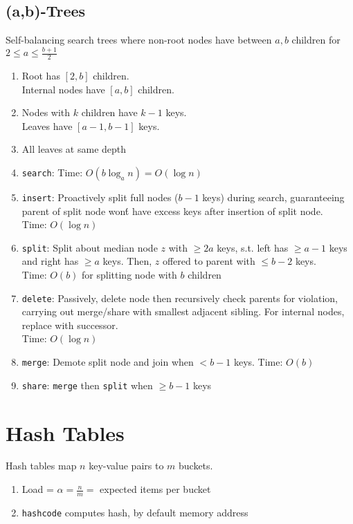 \documentclass[12pt, a4paper]{article}
\begin{document}
\begin{multicols*}{3}
\subsection{(a,b)-Trees}
Self-balancing search trees where non-root nodes have between $a, b$ children for $2 \leq a \leq \frac{b+1}{2}$
\begin{enumerate}[\roman*.]
  \item Root has $[2, b]$ children.\\Internal nodes have $[a, b]$ children.
  \item Nodes with $k$ children have $k-1$ keys.\\Leaves have $[a-1,b-1]$ keys.
  \item All leaves at same depth
  \item \lstinline|search|: Time: $O(b\log_a n) = O(\log n)$
  \item \lstinline|insert|: Proactively split full nodes ($b-1$ keys) during search, guaranteeing parent of split node won\'t have excess keys after insertion of split node.\\Time: $O(\log n)$
  \item \lstinline|split|: Split about median node $z$ with $\geq 2a$ keys, s.t. left has $\geq a-1$ keys and right has $\geq a$ keys. Then, $z$ offered to parent with $\leq b-2$ keys.\\
    Time: $O(b)$ for splitting node with $b$ children
  \item \lstinline|delete|: Passively, delete node then recursively check parents for violation, carrying out merge/share with smallest adjacent sibling. For internal nodes, replace with successor.\\Time: $O(\log n)$ 
  \item \lstinline|merge|: Demote split node and join when $< b-1$ keys. Time: $O(b)$ 
  \item \lstinline|share|: \lstinline|merge| then \lstinline|split| when $\geq b-1$ keys
\end{enumerate}

\section{Hash Tables}

Hash tables map $n$ key-value pairs to $m$ buckets.
\begin{enumerate}[\roman*.]
  \item Load = $\alpha = \frac{n}{m} =$ expected items per bucket
  \item \lstinline|hashcode| computes hash, by default memory address
\end{enumerate}


\end{multicols*}
\end{document}

